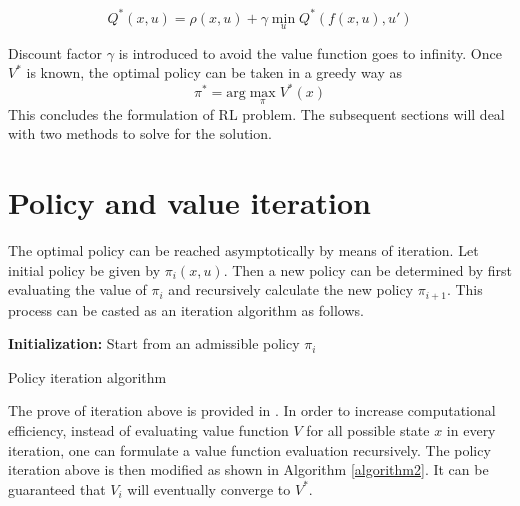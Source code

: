 \begin{equation}
Q^*(x,u) = \rho(x,u) + \gamma \min_{u} Q^*(f(x,u),u')
\label{eq:bellman2}
\end{equation}

Discount factor $\gamma$ is introduced to avoid the value function goes to infinity. Once $V^*$ is known, the optimal policy can be taken in a greedy way as
\begin{equation}
\pi^* = \text{arg} \max_{\pi} V^*(x)
\label{eq:optPi}
\end{equation}
This concludes the formulation of \ac{RL} problem. The subsequent sections will deal with two methods to solve for the solution.

\section{Policy and value iteration} \label{sec:value_iter}
The optimal policy can be reached asymptotically by means of iteration. Let initial policy be given by $ \pi_i(x,u) $. Then a new policy can be determined by first evaluating the value of $ \pi_i $ and recursively calculate the new policy $ \pi_{i+1} $. This process can be casted as an iteration algorithm as follows.

\begin{algorithm}[H]
	\textbf{Initialization:} Start from an admissible policy $ \pi_{i} $\\
\caption{Policy iteration algorithm}
\end{algorithm}

The prove of iteration above is provided in \cite{Bertsekas}. In order to increase computational efficiency, instead of evaluating value function $V$ for all possible state $x$ in every iteration, one can formulate a value function evaluation recursively. The policy iteration above is then modified as shown in Algorithm \ref{algorithm2}. It can be guaranteed that $V_i$ will eventually converge to $V^*$.

